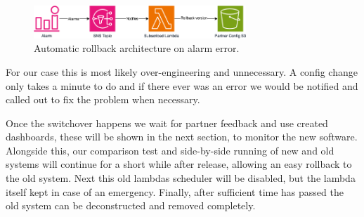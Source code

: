   \begin{figure}[H]
    \centering
    \includegraphics[width=8cm]{assets/rollback.drawio.png}
    \caption{Automatic rollback architecture on alarm error.}
    \label{fig:rollback}
  \end{figure}

  For our case this is most likely over-engineering and unnecessary. A config change only takes a minute to do and if there ever was an error we 
  would be notified and called out to fix the problem when necessary. 

  Once the switchover happens we wait for partner feedback and use created dashboards, these will be shown in the next section, to monitor 
  the new software. Alongside this, our comparison test and side-by-side running of new and old systems will continue for a short while after release, 
  allowing an easy rollback to the old system. Next this old lambdas scheduler will be disabled, but the lambda itself kept in case of an emergency. 
  Finally, after sufficient time has passed the old system can be deconstructed and removed completely.

\newpage
